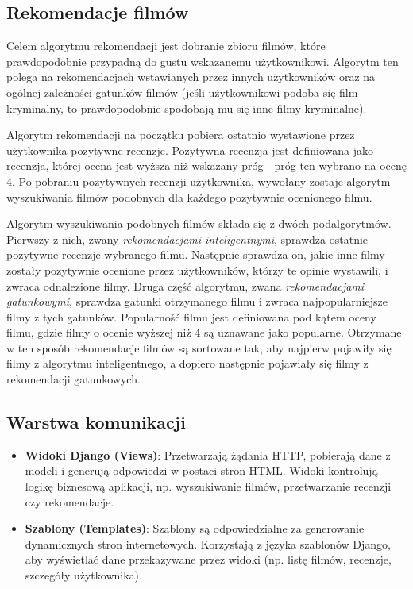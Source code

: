 \documentclass[../main.tex]{subfiles}
\begin{document}
\subsection{Rekomendacje filmów}
Celem algorytmu rekomendacji jest dobranie zbioru filmów, które prawdopodobnie przypadną do gustu wskazanemu użytkownikowi. Algorytm ten polega na rekomendacjach wstawianych przez innych użytkowników oraz na ogólnej zależności gatunków filmów (jeśli użytkownikowi podoba się film kryminalny, to prawdopodobnie spodobają mu się inne filmy kryminalne).

Algorytm rekomendacji na początku pobiera ostatnio wystawione przez użytkownika pozytywne recenzje. Pozytywna recenzja jest definiowana jako recenzja, której ocena jest wyższa niż wskazany próg - próg ten wybrano na ocenę 4. Po pobraniu pozytywnych recenzji użytkownika, wywołany zostaje algorytm wyszukiwania filmów podobnych dla każdego pozytywnie ocenionego filmu.

Algorytm wyszukiwania podobnych filmów składa się z dwóch podalgorytmów. Pierwszy z nich, zwany \textit{rekomendacjami inteligentnymi}, sprawdza ostatnie pozytywne recenzje wybranego filmu. Następnie sprawdza on, jakie inne filmy zostały pozytywnie ocenione przez użytkowników, którzy te opinie wystawili, i zwraca odnalezione filmy. Druga część algorytmu, zwana \textit{rekomendacjami gatunkowymi}, sprawdza gatunki otrzymanego filmu i zwraca najpopularniejsze filmy z tych gatunków. Popularność filmu jest definiowana pod kątem oceny filmu, gdzie filmy o ocenie wyższej niż 4 są uznawane jako popularne. Otrzymane w ten sposób rekomendacje filmów są sortowane tak, aby najpierw pojawiły się filmy z algorytmu inteligentnego, a dopiero następnie pojawiały się filmy z rekomendacji gatunkowych.

\subsection{Warstwa komunikacji}
\begin{itemize}
	\item \textbf{Widoki Django (Views)}: Przetwarzają żądania HTTP, pobierają dane z modeli i generują odpowiedzi w postaci stron HTML. Widoki kontrolują logikę biznesową aplikacji, np. wyszukiwanie filmów, przetwarzanie recenzji czy rekomendacje.
    \item \textbf{Szablony (Templates)}: Szablony są odpowiedzialne za generowanie dynamicznych stron internetowych. Korzystają z języka szablonów Django, aby wyświetlać dane przekazywane przez widoki (np. listę filmów, recenzje, szczegóły użytkownika).
\end{itemize}
\end{document}
